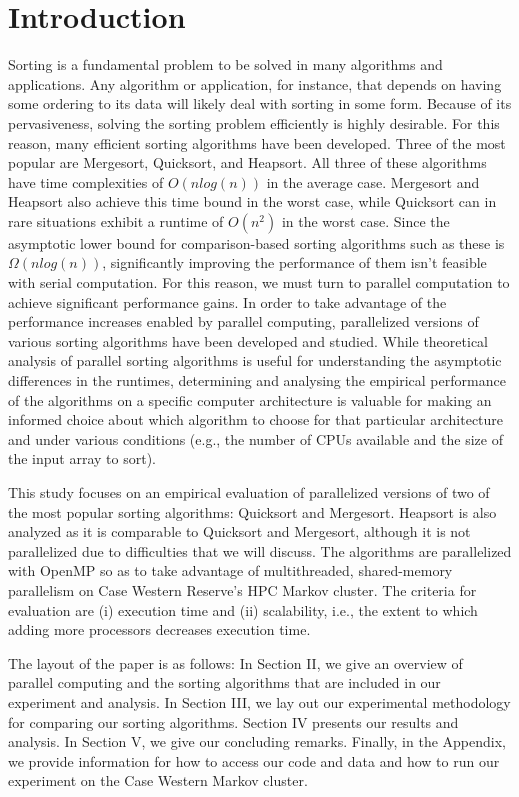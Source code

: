 \documentclass[conference]{IEEEtran}
\begin{document}
	\section{Introduction}
	Sorting is a fundamental problem to be solved in many algorithms and applications.
	Any algorithm or application, for instance, that depends on having some ordering to its data will likely deal with sorting in some form. Because of its pervasiveness, solving the sorting problem efficiently is highly desirable. For this reason, many efficient sorting algorithms have been developed. Three of the most popular are Mergesort, Quicksort, and Heapsort. All three of these algorithms have time complexities of $O(nlog(n))$ in the average case. Mergesort and Heapsort also achieve this time bound in the worst case, while Quicksort can in rare situations exhibit a runtime of $O(n^2)$ in the worst case. Since the asymptotic lower bound for comparison-based sorting algorithms such as these is $\Omega(nlog(n))$, significantly improving the performance of them isn't feasible with serial computation. For this reason, we must turn to parallel computation to achieve significant performance gains. In order to take advantage of the performance increases enabled by parallel computing, parallelized versions of various sorting algorithms have been developed and studied. While theoretical analysis of parallel sorting algorithms is useful for understanding the asymptotic differences in the runtimes, determining and analysing the empirical performance of the algorithms on a specific computer architecture is valuable for making an informed choice about which algorithm to choose for that particular architecture and under various conditions (e.g., the number of CPUs available and the size of the input array to sort).
	
	This study focuses on an empirical evaluation of parallelized versions of two of the most popular sorting algorithms: Quicksort and Mergesort. Heapsort is also analyzed as it is comparable to Quicksort and Mergesort, although it is not parallelized due to difficulties that we will discuss. The algorithms are parallelized with OpenMP so as to take advantage of multithreaded, shared-memory parallelism on Case Western Reserve's HPC Markov cluster. The criteria for evaluation are (i) execution time and (ii) scalability, i.e., the extent to which adding more processors decreases execution time.
	
	\indent The layout of the paper is as follows: In Section II, we give an overview of parallel computing and the sorting algorithms that are included in our experiment and analysis. In Section III, we lay out our experimental methodology for comparing our sorting algorithms. Section IV presents our results and analysis. In Section V, we give our concluding remarks. Finally, in the Appendix, we provide information for how to access our code and data and how to run our experiment on the Case Western Markov cluster. %
	
\end{document}
